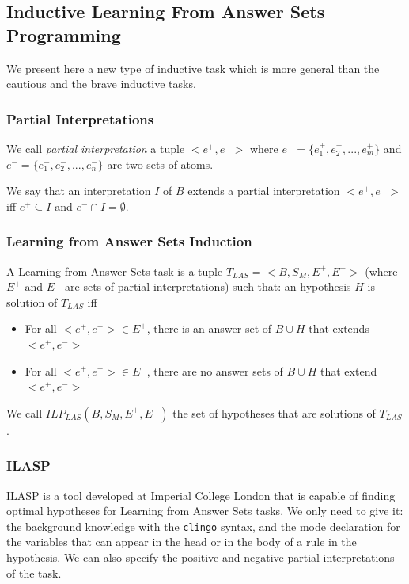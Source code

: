 
\subsection{Inductive Learning From Answer Sets Programming}

We present here a new type of inductive task which is more general than the cautious and the brave inductive tasks.

\subsubsection{Partial Interpretations}

We call \textit{partial interpretation} a tuple $<e^+,e^->$ where $e^+=\{e^+_1,e^+_2,...,e^+_m\}$ and $e^-=\{e^-_1,e^-_2,...,e^-_n\}$ are two sets of atoms.

\smallskip

We say that an interpretation $I$ of $B$ extends a partial interpretation $<e^+,e^->$ iff $e^+ \subseteq I$ and $e^- \cap I = \emptyset$.

\subsubsection{Learning from Answer Sets Induction}

A Learning from Answer Sets task is a tuple $T_{LAS}=<B, S_M, E^+, E^->$ (where $E^+$ and $E^-$ are sets of partial interpretations) such that: an hypothesis $H$ is solution of $T_{LAS}$ iff 
\begin{itemize}
\item For all  $<e^+,e^->\in E^+$, there is an answer set of $B\cup H$ that extends $<e^+,e^->$
\item For all  $<e^+,e^->\in E^-$, there are no answer sets of $B\cup H$ that extend $<e^+,e^->$
\end{itemize}

We call $ILP_{LAS}(B,S_M,E^+,E^-)$ the set of hypotheses that are solutions of $T_{LAS}$. 

\subsubsection{ILASP}

ILASP is a tool developed at Imperial College London that is capable of finding optimal hypotheses for Learning from Answer Sets tasks. We only need to give it: the background knowledge with the \texttt{clingo} syntax, and the mode declaration for the variables that can appear in the head or in the body of a rule in the hypothesis. We can also specify the positive and negative partial interpretations of the task.

